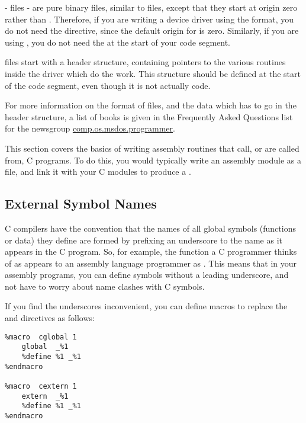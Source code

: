 
 -  files - are pure binary files,
similar to  files, except that they start at origin zero
rather than . Therefore, if you are writing a device driver
using the  format, you do not need the  directive,
since the default origin for  is zero. Similarly, if you are
using , you do not need the  at the start of
your code segment.

 files start with a header structure, containing pointers to
the various routines inside the driver which do the work. This
structure should be defined at the start of the code segment, even
though it is not actually code.

For more information on the format of  files, and the data
which has to go in the header structure, a list of books is given in
the Frequently Asked Questions list for the newsgroup
\href{news:comp.os.msdos.programmer}{comp.os.msdos.programmer}.


This section covers the basics of writing assembly routines that
call, or are called from, C programs. To do this, you would
typically write an assembly module as a  file, and link it
with your C modules to produce a .

\subsection{External Symbol Names}
\label{subsec:16cunder}

C compilers have the
convention that the names of all global symbols (functions or data)
they define are formed by prefixing an underscore to the name as it
appears in the C program. So, for example, the function a C
programmer thinks of as  appears to an assembly language
programmer as . This means that in your assembly
programs, you can define symbols without a leading underscore, and
not have to worry about name clashes with C symbols.

If you find the underscores inconvenient, you can define macros to
replace the  and  directives as follows:

\begin{lstlisting}
%macro  cglobal 1
    global  _%1
    %define %1 _%1
%endmacro

%macro  cextern 1
    extern  _%1
    %define %1 _%1
%endmacro
\end{lstlisting}

